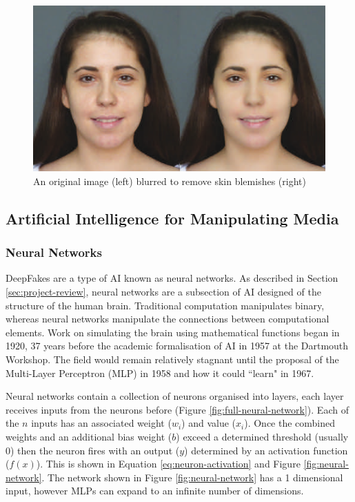 \begin{figure}[H]
    \centering
    \includegraphics[width=0.5\linewidth]{dissertation//figures/blurring.png}
    \caption{An original image (left) blurred to remove skin blemishes (right)\cite{corcoran2014digital}}
    \label{fig:beauty-filter}
\end{figure}

\subsection{Artificial Intelligence for Manipulating Media}

\subsubsection{Neural Networks}

DeepFakes are a type of AI known as neural networks. As described in Section \ref{sec:project-review}, neural networks are a subsection of AI designed of the structure of the human brain\cite{islam2019overview}. Traditional computation manipulates binary, whereas neural networks manipulate the connections between computational elements. Work on simulating the brain using mathematical functions began in 1920\cite{brush1967history}, 37 years before the academic formalisation of AI in 1957 at the Dartmouth Workshop\cite{crevier1993ai}. The field would remain relatively stagnant until the proposal of the Multi-Layer Perceptron (MLP) in 1958\cite{rosenblatt1958perceptron} and how it could ``learn" in 1967\cite{ivakhnenko1967cybernetics}.

Neural networks contain a collection of neurons organised into layers, each layer receives inputs from the neurons before (Figure \ref{fig:full-neural-network}). Each of the $n$ inputs has an associated weight ($w_i$) and value ($x_i$). Once the combined weights and an additional bias weight ($b$) exceed a determined threshold (usually 0) then the neuron fires with an output ($y$) determined by an activation function ($f(x)$). This is shown in Equation \ref{eq:neuron-activation} and Figure \ref{fig:neural-network}. The network shown in Figure \ref{fig:neural-network} has a 1 dimensional input, however MLPs can expand to an infinite number of dimensions.

